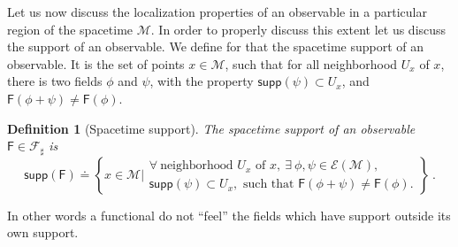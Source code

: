 \documentclass[10pt]{book}
\newcommand{\supp}{\mathsf{supp}}
\newcommand{\Ecal}{\mathcal{E}}
\newcommand{\Fcal}{\mathcal{F}}
\newcommand{\Mcal}{\mathcal{M}}
\newcommand{\Fsf}{\mathsf{F}}
\theoremstyle{break}
\newtheorem{definition}{Definition}
\begin{document}
\bigskip

Let us now discuss the localization properties of an observable in a particular region of the spacetime $\Mcal$. In order to properly discuss this extent let us discuss the support of an observable. We define for that the spacetime support of an observable. It is the set of points $x \in \Mcal$, such that for all neighborhood $U_x$ of $x$, there is two fields $\phi$ and $\psi$, with the property $\supp\left(\psi\right) \subset U_x$, and $\Fsf(\phi+\psi) \neq \Fsf(\phi)$.
%
\begin{definition}[Spacetime support] \label{def:spacetime-supp}
The spacetime support of an observable $\Fsf \in \Fcal_\sharp$ is
%
\begin{equation*}
\supp(\Fsf) \doteq \left\{ x \in \Mcal \bigg| 
\begin{array}{l} 
\forall \ \mbox{neighborhood } U_x \mbox{ of } x, \ \exists \ \phi, \psi \in \Ecal(\Mcal), \\
\supp(\psi) \subset U_x, \mbox{ such that } \Fsf(\phi + \psi) \neq \Fsf(\phi).
\end{array}
\right\} \ .
\end{equation*}
%
\end{definition}
%
In other words a functional do not ``feel'' the fields which have support outside its own support.
\end{document}
